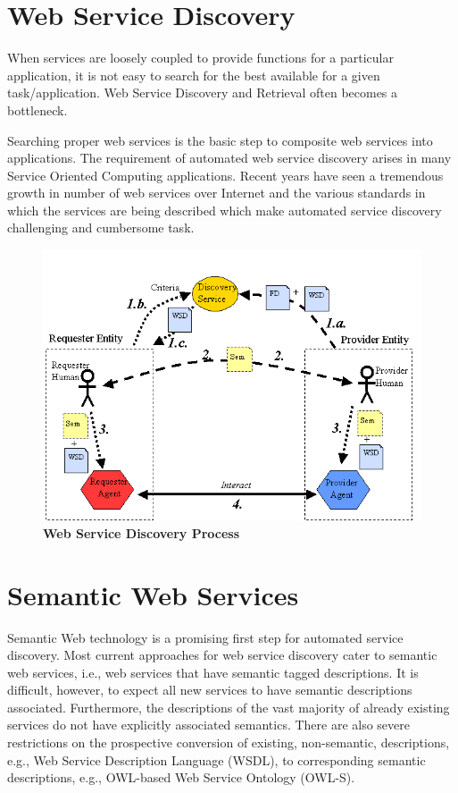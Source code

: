 \documentclass[12pt, twoside]{book}
\begin{document}
\section{Web Service Discovery}
When services are loosely coupled to provide functions for a particular application, it is not easy to search for the best available for a given task/application. Web Service Discovery and Retrieval often becomes a bottleneck. \\ \par
Searching proper web services is the basic step to composite web services into applications. The requirement of automated web service discovery arises in many Service Oriented Computing applications. Recent years have seen a tremendous growth in number of web services over Internet and the various standards in which the services are being described which make automated service discovery challenging and cumbersome task. \\ \par
\begin{figure}[H]
 \centering
 \includegraphics[width=\textwidth]{pics/discovery_process.png}
 \caption{\textbf{Web Service Discovery Process}}
\end{figure}


\section{Semantic Web Services}
Semantic Web technology is a promising first step for automated service discovery. Most current approaches for web service discovery cater to semantic web services, i.e., web services that have semantic tagged descriptions. It is difficult, however, to expect all new services to have semantic descriptions associated. Furthermore, the descriptions of the vast majority of already existing services do not have explicitly associated semantics. There are also severe restrictions on the prospective conversion of existing, non-semantic, descriptions, e.g., Web Service Description Language (WSDL), to corresponding semantic descriptions, e.g., OWL-based Web Service Ontology (OWL-S). \\ \par
\end{document}
